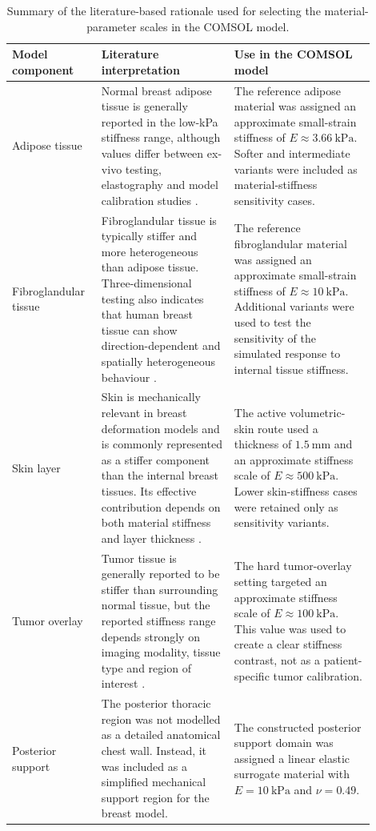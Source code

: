 \begin{table}[H]
\centering
\small
\caption{Summary of the literature-based rationale used for selecting the material-parameter scales in the COMSOL model.}
\label{appendix_material_parameter_rationale_table}
\begin{tabular}{p{0.20\linewidth} p{0.34\linewidth} p{0.36\linewidth}}
\toprule
Model component & Literature interpretation & Use in the COMSOL model \\
\midrule
Adipose tissue 
& Normal breast adipose tissue is generally reported in the low-kPa stiffness range, although values differ between ex-vivo testing, elastography and model calibration studies \cite{Samani2007,Ramiao2016,Teixeira2023}. 
& The reference adipose material was assigned an approximate small-strain stiffness of $E\approx3.66~\mathrm{kPa}$. Softer and intermediate variants were included as material-stiffness sensitivity cases. \\

Fibroglandular tissue 
& Fibroglandular tissue is typically stiffer and more heterogeneous than adipose tissue. Three-dimensional testing also indicates that human breast tissue can show direction-dependent and spatially heterogeneous behaviour \cite{Goodbrake2022}. 
& The reference fibroglandular material was assigned an approximate small-strain stiffness of $E\approx10~\mathrm{kPa}$. Additional variants were used to test the sensitivity of the simulated response to internal tissue stiffness. \\

Skin layer 
& Skin is mechanically relevant in breast deformation models and is commonly represented as a stiffer component than the internal breast tissues. Its effective contribution depends on both material stiffness and layer thickness \cite{Chen2025,Teixeira2023}. 
& The active volumetric-skin route used a thickness of $1.5~\mathrm{mm}$ and an approximate stiffness scale of $E\approx500~\mathrm{kPa}$. Lower skin-stiffness cases were retained only as sensitivity variants. \\

Tumor overlay 
& Tumor tissue is generally reported to be stiffer than surrounding normal tissue, but the reported stiffness range depends strongly on imaging modality, tissue type and region of interest \cite{Samani2007,McKnight2002,Patel2021,Patel2022}. 
& The hard tumor-overlay setting targeted an approximate stiffness scale of $E\approx100~\mathrm{kPa}$. This value was used to create a clear stiffness contrast, not as a patient-specific tumor calibration. \\

Posterior support 
& The posterior thoracic region was not modelled as a detailed anatomical chest wall. Instead, it was included as a simplified mechanical support region for the breast model. 
& The constructed posterior support domain was assigned a linear elastic surrogate material with $E=10~\mathrm{kPa}$ and $\nu=0.49$. \\
\bottomrule
\end{tabular}
\end{table}

